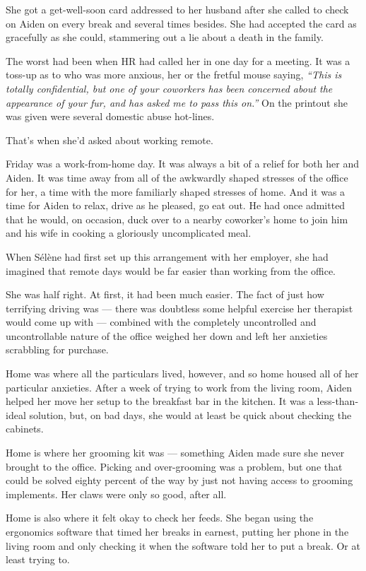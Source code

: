 She got a get-well-soon card addressed to her husband after she called to check on Aiden on every break and several times besides. She had accepted the card as gracefully as she could, stammering out a lie about a death in the family.

The worst had been when HR had called her in one day for a meeting. It was a toss-up as to who was more anxious, her or the fretful mouse saying, \emph{``This is totally confidential, but one of your coworkers has been concerned about the appearance of your fur, and has asked me to pass this on.''} On the printout she was given were several domestic abuse hot-lines.

That's when she'd asked about working remote.

Friday was a work-from-home day. It was always a bit of a relief for both her and Aiden. It was time away from all of the awkwardly shaped stresses of the office for her, a time with the more familiarly shaped stresses of home. And it was a time for Aiden to relax, drive as he pleased, go eat out. He had once admitted that he would, on occasion, duck over to a nearby coworker's home to join him and his wife in cooking a gloriously uncomplicated meal.

When Sélène had first set up this arrangement with her employer, she had imagined that remote days would be far easier than working from the office.

She was half right. At first, it had been much easier. The fact of just how terrifying driving was --- there was doubtless some helpful exercise her therapist would come up with --- combined with the completely uncontrolled and uncontrollable nature of the office weighed her down and left her anxieties scrabbling for purchase.

Home was where all the particulars lived, however, and so home housed all of her particular anxieties. After a week of trying to work from the living room, Aiden helped her move her setup to the breakfast bar in the kitchen. It was a less-than-ideal solution, but, on bad days, she would at least be quick about checking the cabinets.

Home is where her grooming kit was --- something Aiden made sure she never brought to the office. Picking and over-grooming was a problem, but one that could be solved eighty percent of the way by just not having access to grooming implements. Her claws were only so good, after all.

Home is also where it felt okay to check her feeds. She began using the ergonomics software that timed her breaks in earnest, putting her phone in the living room and only checking it when the software told her to put a break. Or at least trying to.

